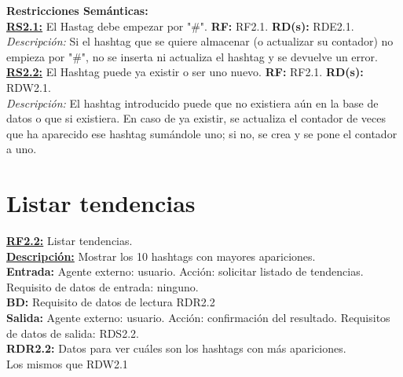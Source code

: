 \textbf{\textcolor{verde}{Restricciones Semánticas:}} \\[6pt]
\textbf{\textcolor{verde}{\underline{RS2.1:}}} El Hastag debe empezar por "\#". \textbf{RF:} RF2.1. \textbf{RD(s):} RDE2.1. \\
\hspace*{1cm} \textit{Descripción:} Si el hashtag que se quiere almacenar (o actualizar su contador) no empieza por "\#", no se inserta ni actualiza el hashtag y se devuelve un error. \\[6pt]

\textbf{\textcolor{verde}{\underline{RS2.2:}}} El Hashtag puede ya existir o ser uno nuevo. \textbf{RF:} RF2.1. \textbf{RD(s):} RDW2.1. \\
\hspace*{1cm} \textit{Descripción:} El hashtag introducido puede que no existiera aún en la base de datos o que si existiera. En caso de ya existir, se actualiza el contador de veces que ha aparecido ese hashtag sumándole uno; si no, se crea y se pone el contador a uno.\\[6pt]

\pagebreak

\section{Listar tendencias}
\textbf{\textcolor{rojo}{\underline{RF2.2:}}} Listar tendencias. \\[6pt]

\textbf{\textcolor{rojo}{\underline{Descripción:}}} Mostrar los 10 hashtags con mayores apariciones.
 \\[6pt]

\textbf{\textcolor{rojo}{Entrada:}} Agente externo: usuario. Acción: solicitar listado de tendencias. 
Requisito de datos de entrada: ninguno. \\[6pt]

\textbf{\textcolor{rojo}{BD:}} Requisito de datos de lectura \textcolor{azul}{RDR2.2}\\[6pt]

\textbf{\textcolor{rojo}{Salida:}} Agente externo: usuario. Acción: confirmación del resultado.
Requisitos de datos de salida: \textcolor{azul}{RDS2.2}. \\[6pt] 

\textcolor{azul}{\textbf{RDR2.2:}} Datos para ver cuáles son los hashtags con más apariciones. \\
\hspace*{1cm} Los mismos que RDW2.1\\

